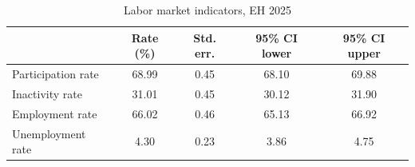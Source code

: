 \begin{table}[htbp]\centering
\def\sym#1{\ifmmode^{#1}\else\(^{#1}\)\fi}
\caption{Labor market indicators, EH 2025}
\begin{tabular}{l*{1}{cccc}}
\toprule
            &   Rate (\%)&   Std. err.&95\% CI lower&95\% CI upper\\
\midrule
Participation rate&       68.99&        0.45&       68.10&       69.88\\
Inactivity rate&       31.01&        0.45&       30.12&       31.90\\
Employment rate&       66.02&        0.46&       65.13&       66.92\\
Unemployment rate&        4.30&        0.23&        3.86&        4.75\\
\bottomrule
\end{tabular}
\end{table}
